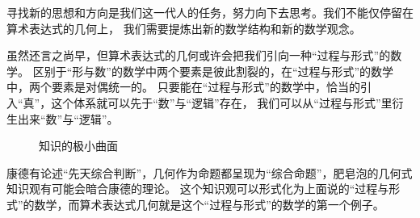 \documentclass[a4paper,12pt]{article}
\numberwithin{problem}{section}
\numberwithin{definition}{section}
\numberwithin{lemma}{section}
\numberwithin{proposition}{section}
\numberwithin{theorem}{section}
\numberwithin{grammar}{section}
\numberwithin{program}{section}
\numberwithin{convention}{section}
\numberwithin{corollary}{section}
\begin{document}
寻找新的思想和方向是我们这一代人的任务，努力向下去思考。我们不能仅停留在算术表达式的几何上，
我们需要提炼出新的数学结构和新的数学观念。

虽然还言之尚早，但算术表达式的几何或许会把我们引向一种“过程与形式”的数学。
区别于“形与数”的数学中两个要素是彼此割裂的，在“过程与形式”的数学中，两个要素是对偶统一的。
只要能在“过程与形式”的数学中，恰当的引入“真”，这个体系就可以先于“数”与“逻辑”存在，
我们可以从“过程与形式”里衍生出来“数”与“逻辑”。

\begin{figure}[ht]
\centering
{}
\caption{知识的极小曲面}
\end{figure}

康德有论述“先天综合判断”，几何作为命题都呈现为“综合命题”，肥皂泡的几何式知识观有可能会暗合康德的理论。
这个知识观可以形式化为上面说的“过程与形式”的数学，而算术表达式几何就是这个“过程与形式”的数学的第一个例子。
\end{document}
